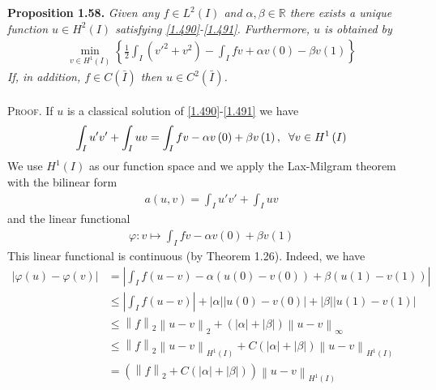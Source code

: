 \documentclass[a4paper,oneside]{book}
\numberwithin{equation}{chapter}
\begin{document}
\textbf{Proposition 1.58.} \textit{Given any $f\in L^2\left(I\right)$ and $\alpha,\beta\in \mathbb{R}$ there exists a unique function $u\in H^2\left(I\right)$ satisfying \eqref{1.490}-\eqref{1.491}. Furthermore, $u$ is obtained by}
\begin{align}
\mathop {\min }\limits_{v \in {H^1}\left( I \right)} \left\{ {\frac{1}{2}\int_I {\left( {v{'^2} + {v^2}} \right)}  - \int_I {fv}  + \alpha v\left( 0 \right) - \beta v\left( 1 \right)} \right\}
\end{align}
\textit{If, in addition, $f\in C\left(\bar I\right)$ then $u\in C^2\left(\bar I\right)$.}\\
\\
\textsc{Proof.} If $u$ is a classical solution of \eqref{1.490}-\eqref{1.491} we have
\begin{align}
\int_I {u'v'}  + \int_I {uv}  = \int_I {fv}  - \alpha v\left( 0 \right) + \beta v\left( 1 \right),\hspace{0.2cm}\forall v \in {H^1}\left( I \right)
\end{align}
We use $H^1\left(I\right)$ as our function space and we apply the Lax-Milgram theorem with the bilinear form 
\begin{align}
a\left( {u,v} \right) = \int_I {u'v'}  + \int_I {uv} 
\end{align}
and the linear functional
\begin{align}
\varphi :v \mapsto \int_I {fv}  - \alpha v\left( 0 \right) + \beta v\left( 1 \right)
\end{align}
This linear functional is continuous (by Theorem 1.26). Indeed, we have
\begin{align}
\left| {\varphi \left( u \right) - \varphi \left( v \right)} \right| &= \left| {\int_I {f\left( {u - v} \right)}  - \alpha \left( {u\left( 0 \right) - v\left( 0 \right)} \right) + \beta \left( {u\left( 1 \right) - v\left( 1 \right)} \right)} \right|\\
& \le \left| {\int_I {f\left( {u - v} \right)} } \right| + \left| \alpha  \right|\left| {u\left( 0 \right) - v\left( 0 \right)} \right| + \left| \beta  \right|\left| {u\left( 1 \right) - v\left( 1 \right)} \right|\\
& \le {\left\| f \right\|_2}{\left\| {u - v} \right\|_2} + \left( {\left| \alpha  \right| + \left| \beta  \right|} \right){\left\| {u - v} \right\|_\infty }\\
& \le {\left\| f \right\|_2}{\left\| {u - v} \right\|_{{H^1}\left( I \right)}} + C\left( {\left| \alpha  \right| + \left| \beta  \right|} \right){\left\| {u - v} \right\|_{{H^1}\left( I \right)}}\\
& = \left( {{{\left\| f \right\|}_2} + C\left( {\left| \alpha  \right| + \left| \beta  \right|} \right)} \right){\left\| {u - v} \right\|_{{H^1}\left( I \right)}}
\end{align}
\end{document}

